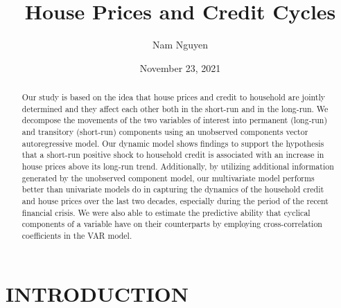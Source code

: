 \documentclass[
  12pt,
]{article}
\title{House Prices and Credit Cycles}
\author{Nam Nguyen}
\date{November 23, 2021}
\begin{document}
\maketitle
\begin{abstract}
Our study is based on the idea that house prices and credit to household are jointly determined and they affect each other both in the short-run and in the long-run. We decompose the movements of the two variables of interest into permanent (long-run) and transitory (short-run) components using an unobserved components vector autoregressive model. Our dynamic model shows findings to support the hypothesis that a short-run positive shock to household credit is associated with an increase in house prices above its long-run trend. Additionally, by utilizing additional information generated by the unobserved component model, our multivariate model performs better than univariate models do in capturing the dynamics of the household credit and house prices over the last two decades, especially during the period of the recent financial crisis. We were also able to estimate the predictive ability that cyclical components of a variable have on their counterparts by employing cross-correlation coefficients in the VAR model.
\end{abstract}

\hypertarget{introduction}{%
\section{INTRODUCTION}\label{introduction}}
\end{document}
